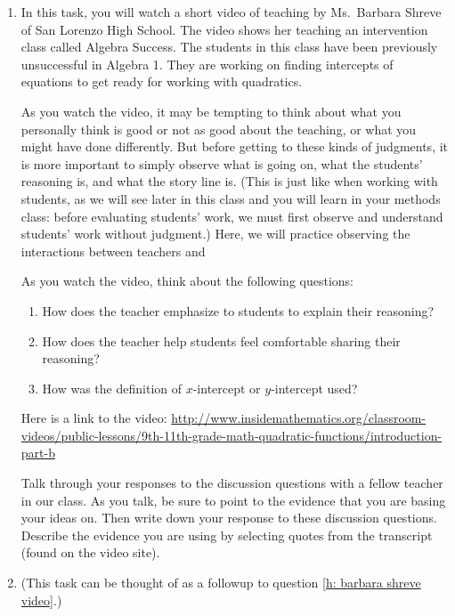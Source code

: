 \documentclass[11pt]{article}
\theoremstyle{definition}
\begin{document}
\begin{enumerate}[resume]
\item %
\label{h: barbara shreve video}
In this task, you will watch a short video of teaching by Ms.~Barbara Shreve of San Lorenzo High School. The video shows her teaching an intervention class called Algebra Success. The students in this class have been previously unsuccessful in Algebra 1. They are working on finding intercepts of equations to get ready for working with quadratics. 

As you watch the video, it may be tempting to think about what you personally think is good or not as good about the teaching, or what you might have done differently. But before getting to these kinds of judgments, it is more important to simply observe what is going on, what the students' reasoning is, and what the story line is. (This is just like when working with students, as we will see later in this class and you will learn in your methods class: before evaluating students' work, we must first observe and understand students' work without judgment.) Here, we will practice observing the interactions between teachers and 

As you watch the video, think about the following questions:
	\begin{enumerate}
	\item How does the teacher emphasize to students to explain their reasoning?
	\item How does the teacher help students feel comfortable sharing their reasoning?
	\item How was the definition of $x$-intercept or $y$-intercept used?
	\end{enumerate}

Here is a link to the video:
\url{http://www.insidemathematics.org/classroom-videos/public-lessons/9th-11th-grade-math-quadratic-functions/introduction-part-b}

Talk through your responses to the discussion questions with a fellow teacher in our class. As you talk, be sure to point to the evidence that you are basing your ideas on. Then write down your response to these discussion questions. Describe the evidence you are using by selecting quotes from the transcript (found on the video site).

\item %
(This task can be thought of as a followup to question \ref{h: barbara shreve video}.)


\end{enumerate}
\end{document}
